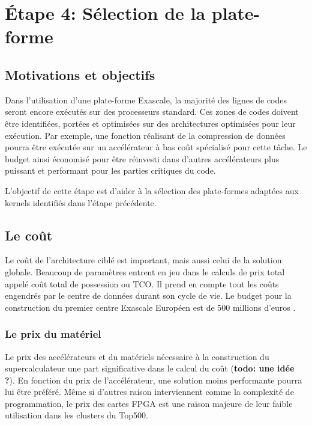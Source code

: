 \section{Étape 4: Sélection de la plate-forme}


\subsection{Motivations et objectifs}


Dans l'utilisation d'une plate-forme Exascale, la majorité des lignes de codes seront encore exécutés sur des processeurs standard. Ces zones de codes doivent être identifiées, portées et optimisées sur des architectures optimisées pour leur exécution. Par exemple, une fonction réalisant de la compression de données pourra être exécutée sur un accélérateur à bas coût spécialisé pour cette tâche. Le budget ainsi économisé pour être réinvesti dans d'autres accélérateurs plus puissant et performant pour les parties critiques du code. 

L'objectif de cette étape est d'aider à la sélection des plate-formes adaptées aux kernels identifiés dans l'étape précédente.


\subsection{Le coût}

Le coût de l'architecture ciblé est important, mais aussi celui de la solution globale. Beaucoup de paramètres entrent en jeu dans le calculs de prix total appelé coût total de possession ou $\text{TCO}$. Il prend en compte tout les coûts engendrés par le centre de données durant son cycle de vie. Le budget pour la construction du premier centre Exascale Européen est de 500 millions d'euros \cite{SergiGirona2018}.

\subsubsection{Le prix du matériel} 
Le  prix des accélérateurs et du matériels nécessaire à la construction du supercalculateur une part significative dans le calcul du coût (\textbf{todo: une idée ?}). En fonction du prix de l'accélérateur, une solution moins performante pourra lui être préféré. Même si d'autres raison interviennent comme la complexité de programmation, le prix des cartes FPGA est une raison majeure de leur faible utilisation dans les clusters du Top500.

